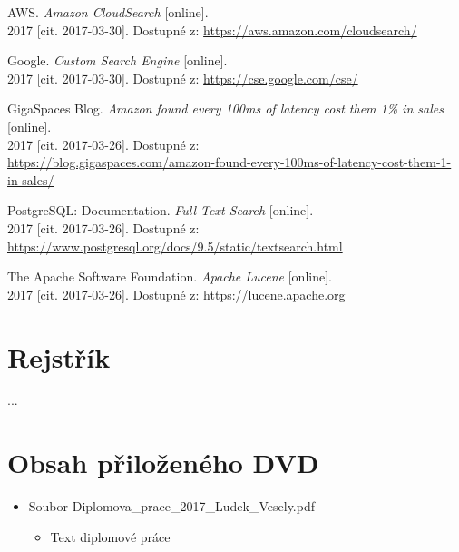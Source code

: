 \documentclass[FM,DP]{tulthesis}
\begin{document}
\begin{thebibliography}{Mm99}
 AWS. \emph{Amazon CloudSearch} [online]. \\
2017 [cit. 2017-03-30]. Dostupné z: \url{https://aws.amazon.com/cloudsearch/}

 Google. \emph{Custom Search Engine} [online]. \\
2017 [cit. 2017-03-30]. Dostupné z: \url{https://cse.google.com/cse/}

 GigaSpaces Blog. \emph{Amazon found every 100ms of latency cost them 1\% in sales} [online]. \\
2017 [cit. 2017-03-26]. Dostupné z:\\
\url{https://blog.gigaspaces.com/amazon-found-every-100ms-of-latency-cost-them-1-in-sales/}

 PostgreSQL: Documentation. \emph{Full Text Search} [online]. \\
2017 [cit. 2017-03-26]. Dostupné z: \url{https://www.postgresql.org/docs/9.5/static/textsearch.html}

 The Apache Software Foundation. \emph{Apache Lucene} [online]. \\
2017 [cit. 2017-03-26]. Dostupné z: \url{https://lucene.apache.org}

\end{thebibliography}


\chapter*{Rejstřík}
...


\appendix

\chapter{Obsah přiloženého DVD}

\begin{itemize}
\item Soubor Diplomova\_prace\_2017\_Ludek\_Vesely.pdf
\begin{itemize}
	\item Text diplomové práce
\end{itemize}

\end{itemize}




\end{document}
